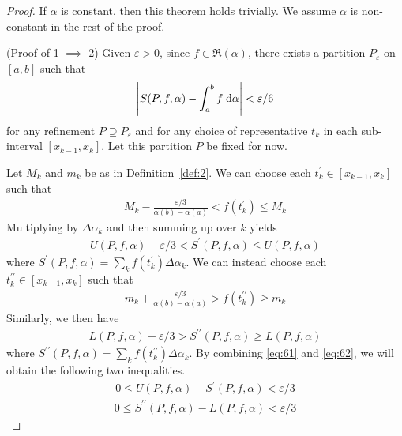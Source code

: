 \documentclass[thmcnt=section, 12pt]{my-elegantbook}
\begin{document}
\begin{proof}
    If $\alpha$ is constant, then this theorem holds trivially. We assume $\alpha$ is non-constant in the rest of the proof.

    (Proof of 1 $\implies$ 2) Given $\varepsilon > 0$, since $f \in \mathfrak{R}(\alpha)$, there exists a partition $P_\varepsilon$ on $[a, b]$ such that 
    \begin{align}
        \left\lvert S(P,f,\alpha) - \int_{a}^{b} f \; \mathrm{d}\alpha \right\rvert < \varepsilon / 6
        \label{eq:60}
    \end{align}
    for any refinement $P \supseteq P_\varepsilon$ and for any choice of representative $t_k$ in each sub-interval $[x_{k-1}, x_k]$. Let this partition $P$ be fixed for now. 

    Let $M_k$ and $m_k$ be as in Definition~\ref{def:2}. We can choose each $t_k^\prime \in [x_{k-1}, x_k]$ such that 
    \begin{align*}
        M_k - \frac{\varepsilon / 3}{\alpha(b) - \alpha(a)}
        < f(t_k^\prime)
        \leq M_k
    \end{align*}
    Multiplying by $\Delta \alpha_k$ and then summing up over $k$ yields
    \begin{align}
        U(P,f,\alpha) - \varepsilon / 3
        < S^\prime(P,f,\alpha)
        \leq U(P,f,\alpha)
        \label{eq:61}
    \end{align}
    where $S^\prime(P,f,\alpha) = \sum_{k} f(t_k^\prime) \Delta\alpha_k$. We can instead choose each $t_k^{\prime\prime} \in [x_{k-1}, x_k]$ such that 
    \begin{align*}
        m_k + \frac{\varepsilon / 3}{\alpha(b) - \alpha(a)}
        > f(t_k^{\prime\prime}) 
        \geq m_k 
    \end{align*}
    Similarly, we then have 
    \begin{align}
        L(P,f,\alpha) + \varepsilon / 3
        > S^{\prime\prime}(P,f,\alpha)
        \geq L(P,f,\alpha) 
        \label{eq:62}
    \end{align}
    where $S^{\prime\prime}(P,f,\alpha) = \sum_{k} f(t_k^{\prime\prime}) \Delta\alpha_k$. By combining \eqref{eq:61} and \eqref{eq:62}, we will obtain the following two inequalities. 
    \begin{align}
        0
        \leq U(P,f,\alpha) - S^{\prime}(P,f,\alpha) 
        < \varepsilon / 3
        \label{eq:63}
    \end{align}
    \begin{align}
        0
        \leq S^{\prime\prime}(P,f,\alpha) - L(P,f,\alpha)
        < \varepsilon / 3
        \label{eq:64}
    \end{align}


\end{proof}
\end{document}
